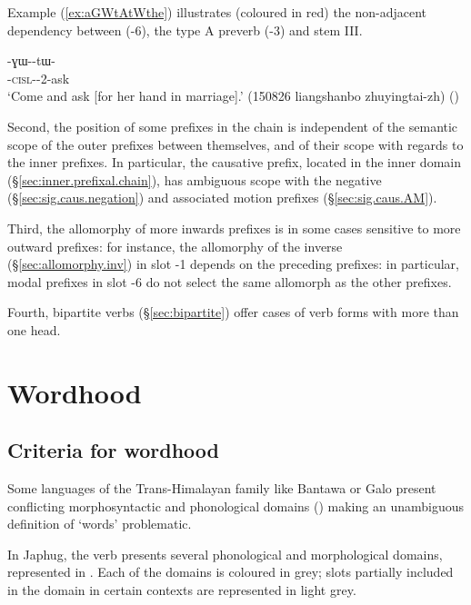  Example (\ref{ex:aGWtAtWthe}) illustrates (coloured in red) the non-adjacent dependency between  (-6), the type A preverb (-3) and stem III.
 
 \begin{exe}
\ex \label{ex:aGWtAtWthe}
\gll {}-ɣɯ--tɯ- \\
 -\textsc{cisl}--2-ask\rouge{[III]} \\
\glt `Come and ask [for her hand in marriage].' (150826 liangshanbo zhuyingtai-zh) ()
\end{exe}
 
  
Second, the position of some prefixes in the chain is independent of the semantic scope of the outer prefixes between themselves, and of their scope with regards to the inner prefixes.  In particular, the causative prefix, located in the inner domain (§\ref{sec:inner.prefixal.chain}), has ambiguous scope with the negative (§\ref{sec:sig.caus.negation}) and associated motion prefixes (§\ref{sec:sig.caus.AM}).  

Third, the allomorphy of more inwards prefixes is in some cases sensitive to more outward prefixes: for instance, the allomorphy of the inverse (§\ref{sec:allomorphy.inv}) in slot -1 depends on the preceding prefixes: in particular, modal prefixes in slot -6 do not select the same allomorph as the other prefixes. 

Fourth, bipartite verbs (§\ref{sec:bipartite}) offer cases of verb forms with more than one head.


 \section{Wordhood} \label{sec:wordhood.verb}

\subsection{Criteria for wordhood} \label{sec:wordhood.criteria.verb}
Some languages of the Trans-Himalayan family  like Bantawa or Galo present conflicting morphosyntactic and phonological domains (\citealt{post09disunity, schiering10prosodic, doornenbal09}) making an unambiguous definition of `words' problematic.
 
In Japhug, the verb presents several phonological and morphological domains, represented in . Each of the domains is coloured in grey; slots partially included in the domain in certain contexts are represented in light grey.
 

